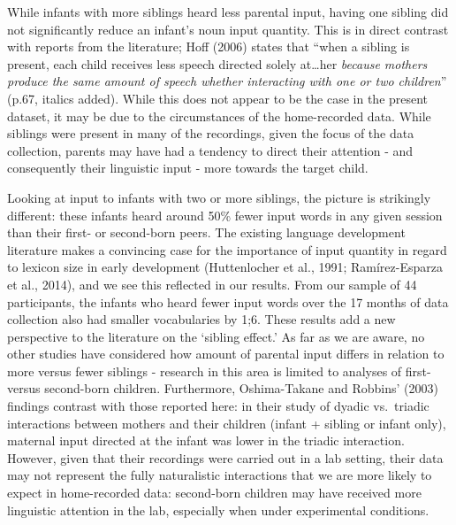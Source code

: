 \documentclass[
  english,
  man,floatsintext]{apa6}
\begin{document}
While infants with more siblings heard less parental input, having one sibling did not significantly reduce an infant's noun input quantity. This is in direct contrast with reports from the literature; Hoff (2006) states that ``when a sibling is present, each child receives less speech directed solely at\ldots her \emph{because mothers produce the same amount of speech whether interacting with one or two children}'' (p.67, italics added). While this does not appear to be the case in the present dataset, it may be due to the circumstances of the home-recorded data. While siblings were present in many of the recordings, given the focus of the data collection, parents may have had a tendency to direct their attention - and consequently their linguistic input - more towards the target child.

Looking at input to infants with two or more siblings, the picture is strikingly different: these infants heard around 50\% fewer input words in any given session than their first- or second-born peers. The existing language development literature makes a convincing case for the importance of input quantity in regard to lexicon size in early development (Huttenlocher et al., 1991; Ramírez-Esparza et al., 2014), and we see this reflected in our results. From our sample of 44 participants, the infants who heard fewer input words over the 17 months of data collection also had smaller vocabularies by 1;6. These results add a new perspective to the literature on the `sibling effect.' As far as we are aware, no other studies have considered how amount of parental input differs in relation to more versus fewer siblings - research in this area is limited to analyses of first- versus second-born children. Furthermore, Oshima-Takane and Robbins' (2003) findings contrast with those reported here: in their study of dyadic vs.~triadic interactions between mothers and their children (infant + sibling or infant only), maternal input directed at the infant was lower in the triadic interaction. However, given that their recordings were carried out in a lab setting, their data may not represent the fully naturalistic interactions that we are more likely to expect in home-recorded data: second-born children may have received more linguistic attention in the lab, especially when under experimental conditions.
\end{document}

